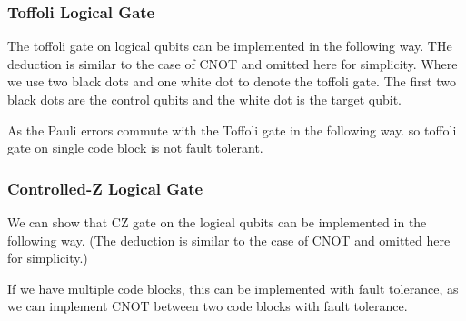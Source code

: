 \subsubsection{Toffoli Logical Gate}

The toffoli gate on logical qubits can be implemented in the following way.
THe deduction is similar to the case of CNOT and omitted here for simplicity.
Where we use two black dots and one white dot to denote the toffoli gate. 
The first two black dots are the control qubits and the white dot is the target qubit.

As the Pauli errors commute with the Toffoli gate in the following way.
so toffoli gate on single code block is not fault tolerant.

\subsubsection{Controlled-Z Logical Gate}

We can show that CZ gate on the logical qubits can be implemented in the following way. 
(The deduction is similar to the case of CNOT and omitted here for simplicity.)


If we have multiple code blocks, this can be implemented with fault tolerance, as we can implement CNOT between two code blocks with fault tolerance.
